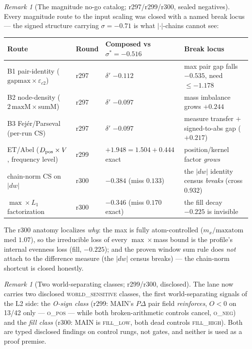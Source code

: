 \documentclass[11pt]{article}
\theoremstyle{definition}
\theoremstyle{remark}
\newtheorem{remark}[theorem]{Remark}
\begin{document}
\begin{remark}[The magnitude no-go catalog; r297/r299/r300, sealed
negatives]\label{rem:magnitude-nogo}
Every magnitude route to the input scaling was closed with a named
break locus --- the signed structure carrying $\sigma = -0.71$ is
what $|\cdot|$-chains cannot see:
\begin{center}\small
\begin{tabular}{@{}llll@{}}
\toprule
\textbf{Route} & \textbf{Round} & \textbf{Composed vs $\sigma^* =
-0.516$} & \textbf{Break locus}\\
\midrule
B1 pair-identity ($\mathrm{gapmax}\times\varepsilon_{c2}$) & r297 &
$\delta'$ $-0.112$ & max pair gap falls $-0.535$, need $\le -1.178$\\
B2 node-density ($2\,\mathrm{maxM}\times\mathrm{sumM}$) & r297 &
$\delta'$ $-0.097$ & mass imbalance grows $+0.244$\\
B3 Fej\'er/Parseval (per-run CS) & r297 & $\delta'$ $-0.097$ &
measure transfer $+$ signed-to-abs gap ($+0.217$)\\
ET/Abel ($D_{\rm pos}\times V$, frequency level) & r299 & $+1.948 =
1.504 + 0.444$ exact & position/kernel factor \emph{grows}\\
chain-norm CS on $|dw|$ & r300 & $-0.384$ (miss $0.133$) & the
$|dw|$ identity census \emph{breaks} (cross $0.932$)\\
$\max \times L_1$ factorization & r300 & $-0.346$ (miss $0.170$
exact) & the fill decay $-0.225$ is invisible\\
\bottomrule
\end{tabular}
\end{center}
The r300 anatomy localizes \emph{why}: the max is fully
atom-controlled ($m_x/\mathrm{maxatom}$ med $1.07$), so the
irreducible loss of every $\max\times$mass bound is the profile's
internal evenness loss (fill, $-0.225$); and the proven window sum
rule does \emph{not} attach to the difference measure (the $|dw|$
census breaks) --- the chain-norm shortcut is closed honestly.
\end{remark}

\begin{remark}[Two world-separating classes; r299/r300, disclosed]
\label{rem:worldclasses}
The lane now carries two disclosed \textsc{world\_sensitive} classes,
the first world-separating signals of the L2 side: the \emph{O-sign
class} (r299: MAIN's $P\Delta$ pair field \emph{reinforces}, $O < 0$
on 13/42 only --- \textsc{o\_pos} --- while both broken-arithmetic
controls cancel, \textsc{o\_neg}) and the \emph{fill class} (r300:
MAIN is \textsc{fill\_low}, both dead controls \textsc{fill\_high}).
Both are typed disclosed findings on control rungs, not gates, and
neither is used as a proof premise.
\end{remark}
\end{document}
